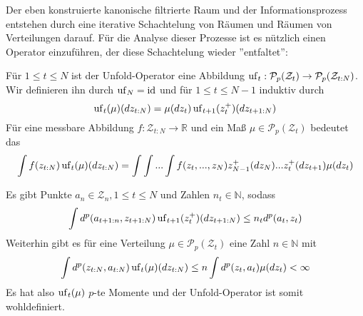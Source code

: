 Der eben konstruierte kanonische filtrierte Raum und der Informationsprozess entstehen durch eine iterative Schachtelung von Räumen und Räumen von Verteilungen darauf. Für die Analyse dieser Prozesse ist es nützlich einen Operator einzuführen, der diese Schachtelung wieder ''entfaltet'':
\begin{definition}
Für $1\leq t\leq N$ ist der Unfold-Operator eine Abbildung $\operatorname{uf}_t:\mathcal{P}_p(\mathcal{Z}_t) \rightarrow \mathcal{P}_p(\mathcal{Z}_{t:N})$. Wir definieren ihn durch $\operatorname{uf}_N=\operatorname{id}$ und für $1\leq t\leq N-1$ induktiv durch
$$\operatorname{uf}_{t}(\mu)(dz_{t:N})=\mu(dz_t)\operatorname{uf}_{t+1}(z_t^+)(dz_{t+1:N})$$
Für eine messbare Abbildung $f:\mathcal{Z}_{t:N}\rightarrow \mathbb{R}$ und ein Maß $\mu\in\mathcal{P}_p(\mathcal{Z}_t)$ bedeutet das
$$\int f(z_{t:N}) \operatorname{uf}_t(\mu)(dz_{t:N}) = \int\int ...\int f(z_t,...,z_N)z^+_{N-1}(dz_N)...z_{t}^+(dz_{t+1})\mu(dz_t)$$
\end{definition}
\begin{lemma}\label{thm:bounded_unfold}
    Es gibt Punkte $a_n \in \mathcal{Z}_n, 1\leq t\leq N$ und Zahlen $n_t \in \mathbb{N}$, sodass 
    $$\int d^p(a_{t+1:n}, z_{t+1:N}) \operatorname{uf}_{t+1}(z_t^+)(dz_{t+1:N})\leq n_td^p(a_t, z_t)$$
    Weiterhin gibt es für eine Verteilung $\mu \in \mathcal{P}_p(\mathcal{Z}_t)$ eine Zahl $n\in \mathbb{N}$ mit
    $$\int d^p(z_{t:N}, a_{t:N})\operatorname{uf}_t(\mu)(dz_{t:N})\leq n\int d^p(z_t, a_t)\mu(dz_t)< \infty$$ 
    Es hat also $\operatorname{uf}_t(\mu)$ $p$-te Momente und der Unfold-Operator ist somit wohldefiniert.
\end{lemma}
